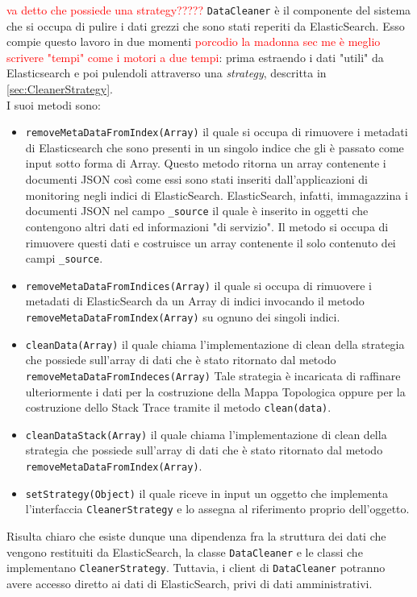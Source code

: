 \label{sec:DataCleaner}
\textcolor{red}{va detto che possiede una strategy?????}
\texttt{DataCleaner} è il componente del sistema che si occupa di pulire i dati grezzi che sono stati reperiti da ElasticSearch. Esso compie questo lavoro in due momenti \textcolor{red}{porcodio la madonna sec me è meglio scrivere "tempi" come i motori a due tempi}: prima estraendo i dati "utili" da Elasticsearch e poi pulendoli attraverso una \emph{strategy}, descritta in \ref{sec:CleanerStrategy}.\\
I suoi metodi sono:
\begin{itemize}
	\item \texttt{removeMetaDataFromIndex(Array)} il quale si occupa di rimuovere i metadati di Elasticsearch che sono presenti in un singolo indice che gli è passato come input sotto forma di Array. Questo metodo ritorna un array contenente i documenti JSON così come essi sono stati inseriti dall'applicazioni di monitoring negli indici di ElasticSearch. ElasticSearch, infatti, immagazzina i documenti JSON nel campo \texttt{\_source} il quale è inserito in oggetti che contengono altri dati ed informazioni "di servizio". Il metodo si occupa di rimuovere questi dati e costruisce un array contenente il solo contenuto dei campi \texttt{\_source}.
	\item \texttt{removeMetaDataFromIndices(Array)} il quale si occupa di rimuovere i metadati di ElasticSearch da un Array di indici invocando il metodo \texttt{removeMetaDataFromIndex(Array)} su ognuno dei singoli indici.
	\item \texttt{cleanData(Array)} il quale chiama l'implementazione di clean della strategia che possiede sull'array di dati che è stato ritornato dal metodo \texttt{removeMetaDataFromIndeces(Array)}  Tale strategia è incaricata di raffinare ulteriormente i dati per la costruzione della Mappa Topologica oppure per la costruzione dello Stack Trace tramite il metodo \texttt{clean(data)}.
	\item \texttt{cleanDataStack(Array)} il quale chiama l'implementazione di clean della strategia che possiede sull'array di dati che è stato ritornato dal metodo \texttt{removeMetaDataFromIndex(Array)}.
	\item \texttt{setStrategy(Object)} il quale riceve in input un oggetto che implementa l'interfaccia \texttt{CleanerStrategy} e lo assegna al riferimento proprio dell'oggetto.
	
\end{itemize}
Risulta chiaro che esiste dunque una dipendenza fra la struttura dei dati che vengono restituiti da ElasticSearch, la classe \texttt{DataCleaner} e le classi che implementano \texttt{CleanerStrategy}. Tuttavia, i client di \texttt{DataCleaner} potranno avere accesso diretto ai dati di ElasticSearch, privi di dati amministrativi.

